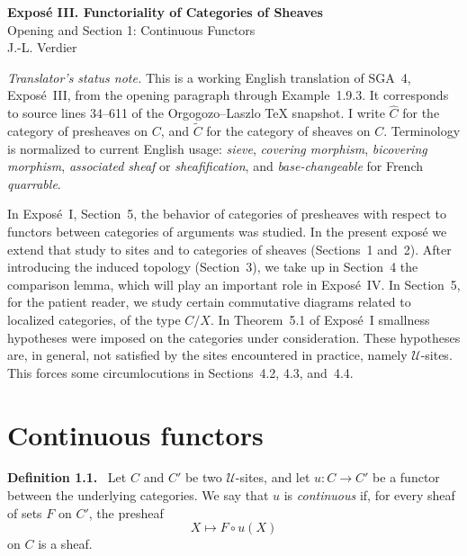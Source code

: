 \documentclass[11pt]{article}
\newcommand{\U}{\mathcal{U}}
\newenvironment{statement}[1]{\par\medskip\noindent\textbf{#1.}\ }{\par\medskip}
\begin{document}
\begin{center}
{\Large \textbf{Expos\'e III. Functoriality of Categories of Sheaves}}\\[0.35em]
{\large Opening and Section 1: Continuous Functors}\\[0.35em]
J.-L. Verdier
\end{center}

\bigskip

\noindent\emph{Translator's status note.} This is a working English translation of SGA~4, Expos\'e~III, from the opening paragraph through Example~1.9.3. It corresponds to source lines 34--611 of the Orgogozo--Laszlo TeX snapshot. I write \(\widehat C\) for the category of presheaves on \(C\), and \(\widetilde C\) for the category of sheaves on \(C\). Terminology is normalized to current English usage: \emph{sieve}, \emph{covering morphism}, \emph{bicov\-ering morphism}, \emph{associated sheaf} or \emph{sheafification}, and \emph{base-changeable} for French \emph{quarrable}.

\bigskip

In Expos\'e~I, Section~5, the behavior of categories of presheaves with respect to functors between categories of arguments was studied. In the present expos\'e we extend that study to sites and to categories of sheaves (Sections~1 and~2). After introducing the induced topology (Section~3), we take up in Section~4 the comparison lemma, which will play an important role in Expos\'e~IV. In Section~5, for the patient reader, we study certain commutative diagrams related to localized categories, of the type \(C/X\). In Theorem~5.1 of Expos\'e~I smallness hypotheses were imposed on the categories under consideration. These hypotheses are, in general, not satisfied by the sites encountered in practice, namely \(\U\)-sites. This forces some circumlocutions in Sections~4.2, 4.3, and~4.4.

\section{Continuous functors}

\begin{statement}{Definition 1.1}
Let \(C\) and \(C'\) be two \(\U\)-sites, and let
\(u:C\to C'\) be a functor between the underlying categories. We say that \(u\) is \emph{continuous} if, for every sheaf of sets \(F\) on \(C'\), the presheaf
\[
X\longmapsto F\circ u(X)
\]
on \(C\) is a sheaf.
\end{statement}
\end{document}
